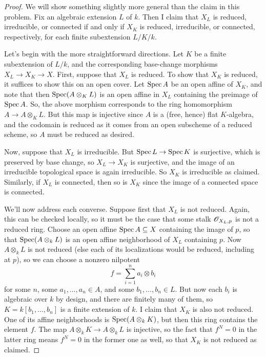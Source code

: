 \begin{proof}
	We will show something slightly more general than the claim in this problem. Fix an algebraic extension $L$ of $k$. Then I claim that $X_L$ is reduced, irreducible, or connected if and only if $X_K$ is reduced, irreducible, or connected, respectively, for each finite subextension $L/K/k$.
	
	Let's begin with the more straightforward directions. Let $K$ be a finite subextension of $L/k$, and the corresponding base-change morphisms $X_L \to X_K \to X$. First, suppose that $X_L$ is reduced. To show that $X_K$ is reduced, it suffices to show this on an open cover. Let $\operatorname{Spec} A$ be an open affine of $X_K$, and note that then $\operatorname{Spec}(A \otimes_K L)$ is an open affine in $X_L$ containing the preimage of $\operatorname{Spec} A$. So, the above morphism corresponds to the ring homomorphism $A \to A \otimes_K L$. But this map is injective since $A$ is a (free, hence) flat $K$-algebra, and the codomain is reduced as it comes from an open subscheme of a reduced scheme, so $A$ must be reduced as desired.
	
	Now, suppose that $X_L$ is irreducible. But $\operatorname{Spec} L \to \operatorname{Spec} K$ is surjective, which is preserved by base change, so $X_L \to X_K$ is surjective, and the image of an irreducible topological space is again irreducible. So $X_K$ is irreducible as claimed. Similarly, if $X_L$ is connected, then so is $X_K$ since the image of a connected space is connected.
	
	We'll now address each converse. Suppose first that $X_L$ is not reduced. Again, this can be checked locally, so it must be the case that some stalk $\mathscr{O}_{X_L,p}$ is not a reduced ring. Choose an open affine $\operatorname{Spec} A \subseteq X$ containing the image of $p$, so that $\operatorname{Spec}(A \otimes_k L)$ is an open affine neighborhood of $X_L$ containing $p$. Now $A \otimes_k L$ is not reduced (else each of its localizations would be reduced, including at $p$), so we can choose a nonzero nilpotent
	\[ f = \sum_{i=1}^n a_i \otimes b_i \]
	for some $n$, some $a_1,\ldots,a_n \in A$, and some $b_1,\ldots,b_n \in L$. But now each $b_i$ is algebraic over $k$ by design, and there are finitely many of them, so $K = k[b_1,\ldots,b_n]$ is a finite extension of $k$. I claim that $X_K$ is also not reduced. One of its affine neighborhoods is $\operatorname{Spec}(A \otimes_k K)$, but then this ring contains the element $f$. The map $A \otimes_k K \to A \otimes_k L$ is injective, so the fact that $f^N = 0$ in the latter ring means $f^N=0$ in the former one as well, so that $X_K$ is not reduced as claimed.
	

\end{proof}
